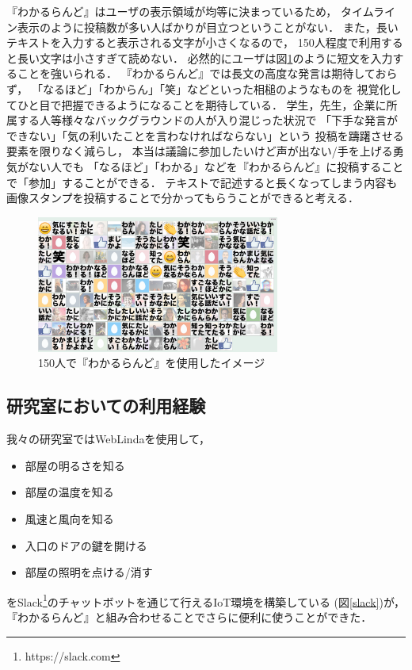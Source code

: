 『わかるらんど』はユーザの表示領域が均等に決まっているため，
タイムライン表示のように投稿数が多い人ばかりが目立つということがない．
また，長いテキストを入力すると表示される文字が小さくなるので，
150人程度で利用すると長い文字は小さすぎて読めない．
必然的にユーザは図\ref{wakaruland150}のように短文を入力することを強いられる．
『わかるらんど』では長文の高度な発言は期待しておらず，
「なるほど」「わからん」「笑」などといった相槌のようなものを
視覚化してひと目で把握できるようになることを期待している．
学生，先生，企業に所属する人等様々なバックグラウンドの人が入り混じった状況で
「下手な発言ができない」「気の利いたことを言わなければならない」という
投稿を躊躇させる要素を限りなく減らし，
本当は議論に参加したいけど声が出ない/手を上げる勇気がない人でも
「なるほど」「わかる」などを『わかるらんど』に投稿することで「参加」することができる．
テキストで記述すると長くなってしまう内容も
画像スタンプを投稿することで分かってもらうことができると考える．


\begin{figure}[h]
\centering
\includegraphics[width=8cm]{images/wakaruland150.png}
\caption{150人で『わかるらんど』を使用したイメージ}
\label{wakaruland150}
\end{figure}

\subsection{研究室においての利用経験}
我々の研究室ではWebLindaを使用して，
\begin{itemize}
\item 部屋の明るさを知る
\item 部屋の温度を知る
\item 風速と風向を知る
\item 入口のドアの鍵を開ける
\item 部屋の照明を点ける/消す
\end{itemize}
をSlack\footnote{https://slack.com}のチャットボットを通じて行えるIoT環境を構築している
(図\ref{slack})が，『わかるらんど』と組み合わせることでさらに便利に使うことができた．

